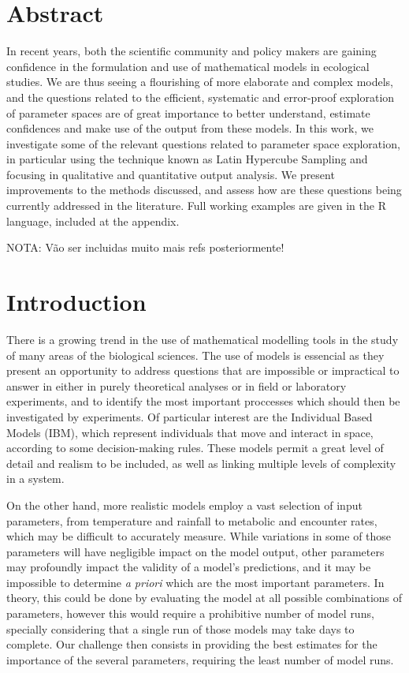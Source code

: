 
\section*{Abstract}
In recent years, both the scientific community and policy makers are gaining
confidence in the formulation and use of mathematical models in ecological 
studies. We are thus seeing a flourishing of more elaborate and complex models, 
and the questions related to the efficient, systematic and error-proof 
exploration of parameter spaces are of great importance to better understand, 
estimate confidences and make use of the output from these models. In this work,
we investigate some of the relevant questions related to parameter space
exploration, in particular using the technique known as Latin Hypercube 
Sampling and focusing in qualitative and quantitative output analysis.
We present improvements to the methods discussed, and 
assess how are these questions being currently addressed in the literature.
Full working examples are given in the R language, included at the appendix.

NOTA: V\~ ao ser incluidas muito mais refs posteriormente!


\section{Introduction}\label{Introduction}
There is a growing trend in the use of mathematical modelling tools in the
study of many areas of the biological sciences. The use of models is essencial
as they present an opportunity to address questions that are impossible or
impractical to answer in either in purely theoretical analyses or in field 
or laboratory experiments, and to identify the most important proccesses which
should then be investigated by experiments. Of particular interest are the 
Individual Based
Models (IBM), which represent individuals that move and interact in space,
according to some decision-making rules. 
These models permit a great level of detail and realism to be included,
as well as linking multiple levels of complexity in a system.

On the other hand, more realistic models employ a vast selection of input
parameters, from temperature and rainfall to metabolic and encounter rates,
which may be difficult to accurately measure. While variations in some of those
parameters will have negligible impact on the model output, other parameters
may profoundly impact the validity of a model's predictions, and it may be
impossible to determine {\em a priori} which are the most important parameters.
In theory, this could be done by evaluating the model at all possible 
combinations of parameters, however this would require a prohibitive number of
model runs, specially considering that a single run of those models may take
days to complete. Our challenge then consists in providing the best estimates
for the importance of the several parameters, requiring the least number of
model runs.

